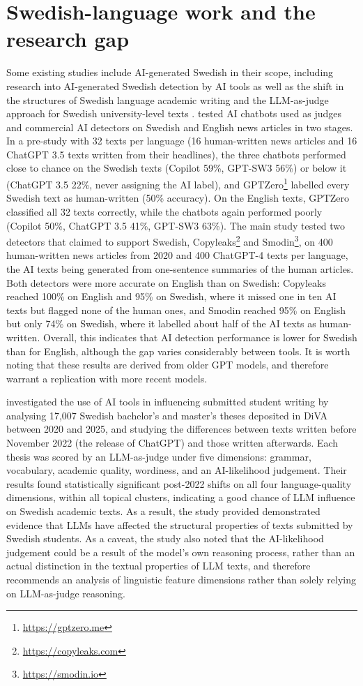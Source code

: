 \documentclass[thesis]{cluu}
\begin{document}
\section{Swedish-language work and the research gap}
Some existing studies include AI-generated Swedish in their scope, including
research into AI-generated Swedish detection by AI tools
\parencite{landberg2024aiwolf} as well as the shift in the structures of
Swedish language academic writing and the LLM-as-judge approach for Swedish
university-level texts \parencite{hintze2026aiuse}. \textcite{landberg2024aiwolf} tested AI chatbots used as judges and commercial AI detectors on Swedish and English news articles in two stages. In a pre-study with 32 texts per language (16 human-written news articles and 16 ChatGPT 3.5 texts written from their headlines), the three chatbots performed close to chance on the Swedish texts (Copilot 59\%, GPT-SW3 56\%) or below it (ChatGPT 3.5 22\%, never assigning the AI label), and GPTZero\footnote{\url{https://gptzero.me}} labelled every Swedish text as human-written (50\% accuracy). On the English texts, GPTZero classified all 32 texts correctly, while the chatbots again performed poorly (Copilot 50\%, ChatGPT 3.5 41\%, GPT-SW3 63\%). The main study tested two detectors that claimed to support Swedish, Copyleaks\footnote{\url{https://copyleaks.com}} and Smodin\footnote{\url{https://smodin.io}}, on 400 human-written news articles from 2020 and 400 ChatGPT-4 texts per language, the AI texts being generated from one-sentence summaries of the human articles. Both detectors were more accurate on English than on Swedish: Copyleaks reached 100\% on English and 95\% on Swedish, where it missed one in ten AI texts but flagged none of the human ones, and Smodin reached 95\% on English but only 74\% on Swedish, where it labelled about half of the AI texts as human-written. Overall, this indicates that AI detection performance is lower for Swedish than for English, although the gap varies considerably between tools. It is worth noting that these results are derived from older GPT models, and therefore warrant a replication with more recent models.

\textcite{hintze2026aiuse} investigated the use of AI tools in influencing submitted student writing by analysing 17,007 Swedish bachelor's and master's theses
deposited in DiVA between 2020 and 2025, and studying the differences between texts written before November 2022 (the release of ChatGPT) and those written afterwards. Each thesis was scored by an LLM-as-judge
under five dimensions: grammar, vocabulary, academic quality, wordiness, and an AI-likelihood judgement. Their results found statistically significant
post-2022 shifts on all four language-quality dimensions, within all topical clusters, indicating a good chance of LLM influence on Swedish academic texts. As a result, the study provided demonstrated evidence that LLMs have affected the structural properties of texts submitted by Swedish students. As a caveat, the study also noted that the AI-likelihood judgement could be a result of the model's own reasoning process, rather than an actual distinction in the textual properties of LLM texts, and therefore recommends an analysis of
linguistic feature dimensions rather than solely relying on LLM-as-judge reasoning.
\end{document}
